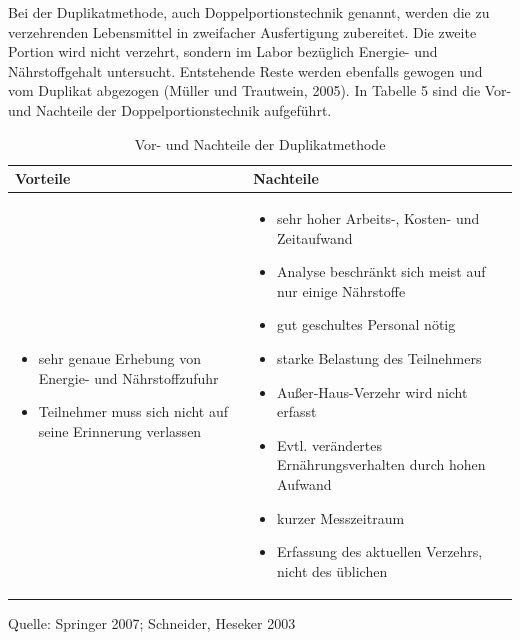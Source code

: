 Bei der Duplikatmethode, auch Doppelportionstechnik genannt, werden die zu verzehrenden Lebensmittel in zweifacher Ausfertigung zubereitet. Die zweite Portion wird nicht verzehrt, sondern im Labor bezüglich Energie- und Nährstoffgehalt untersucht. Entstehende Reste werden ebenfalls gewogen und vom Duplikat abgezogen (Müller und Trautwein, 2005). In Tabelle 5 sind die Vor- und Nachteile der Doppelportionstechnik aufgeführt.


\begin{table}[!h]
\begin{flushleft}
\caption{Vor- und Nachteile der Duplikatmethode }
\end{flushleft}
\begin{tabular}{p{7cm} p{7cm}}
Vorteile & Nachteile \\
\hline

\begin{itemize}
\item sehr genaue Erhebung von Energie- und Nährstoffzufuhr
\item Teilnehmer muss sich nicht auf seine Erinnerung verlassen

\end{itemize}

&

\begin{itemize}
\item sehr hoher Arbeits-, Kosten- und Zeitaufwand
\item Analyse beschränkt sich meist auf nur einige Nährstoffe
\item gut geschultes Personal nötig
\item starke Belastung des Teilnehmers
\item Außer-Haus-Verzehr wird nicht erfasst
\item Evtl. verändertes Ernährungsverhalten durch hohen Aufwand
\item kurzer Messzeitraum
\item Erfassung des aktuellen Verzehrs, nicht des üblichen




\end{itemize}
\end{tabular}
\label{tab:Verzehrsprotokoll}
Quelle: Springer 2007; Schneider, Heseker 2003
\end{table}

